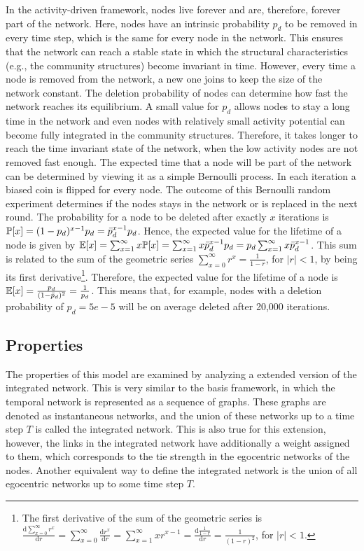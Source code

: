 In the activity-driven framework, nodes live forever and are, therefore, forever part of the network.
Here, nodes have an intrinsic probability \(p_{d}\) to be removed in every time step, which is the same for every node in the network.
This ensures that the network can reach a stable state in which the structural characteristics (e.g., the community structures) become invariant in time.
However, every time a node is removed from the network, a new one joins to keep the size of the network constant.
The deletion probability of nodes can determine how fast the network reaches its equilibrium.
A small value for \(p_{d}\) allows nodes to stay a long time in the network and even nodes with relatively small activity potential can become fully integrated in the community structures.
Therefore, it takes longer to reach the time invariant state of the network, when the low activity nodes are not removed fast enough.
The expected time that a node will be part of the network can be determined by viewing it as a simple Bernoulli process.
In each iteration a biased coin is flipped for every node.
The outcome of this Bernoulli random experiment determines if the nodes stays in the network or is replaced in the next round.
The probability for a node to be deleted after exactly \( x \) iterations is \( \mathbb{P}[{x}] = (1-p_{d})^{x-1} p_{d} = \bar{p}_{d}^{x-1} p_{d}\).
Hence, the expected value for the lifetime of a node is given by \( \mathbb{E}[{x}] = \sum_{x=1}^{\infty} x \mathbb{P}[{x}] = \sum_{x=1}^{\infty} x \bar{p}_{d}^{x-1} p_{d} = p_{d} \sum_{x=1}^{\infty} x \bar{p}_{d}^{x-1} \).
This sum is related to the sum of the geometric series \( \sum_{x=0}^{\infty} r^{x} = \frac{1}{1 - r} \), for \(|r| < 1 \), by being its first derivative\footnote{The first derivative of the sum of the geometric series is \( \frac{\mathrm{d} \sum_{x=0}^{\infty} r^{x}}{\mathrm{d} r} = \sum_{x=0}^{\infty} \frac{\mathrm{d} r^{x}}{\mathrm{d} r} = \sum_{x=1}^{\infty} x r^{x-1} = \frac{\mathrm{d} \frac{1}{1-r}}{\mathrm{d} r} = \frac{1}{(1 - r)^{2}} \), for \(|r| < 1\).}.
Therefore, the expected value for the lifetime of a node is \( \mathbb{E}[{x}] = \frac{p_{d}}{(1 - \bar{p}_{d})^{2}} = \frac{1}{p_{d}} \).
This means that, for example, nodes with a deletion probability of \(p_{d} = 5e-5\) will be on average deleted after 20,000 iterations.


\subsection{Properties}

The properties of this model are examined by analyzing a extended version of the integrated network.
This is very similar to the basis framework, in which the temporal network is represented as a sequence of graphs.
These graphs are denoted as instantaneous networks, and the union of these networks up to a time step \( T \) is called the integrated network.
This is also true for this extension, however, the links in the integrated network have additionally a weight assigned to them, which corresponds to the tie strength in the egocentric networks of the nodes.
Another equivalent way to define the integrated network is the union of all egocentric networks up to some time step \( T \).

